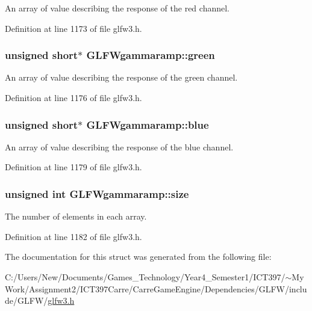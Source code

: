 An array of value describing the response of the red channel. 

Definition at line 1173 of file glfw3.h.\hypertarget{struct_g_l_f_wgammaramp_ffccc6f5df47820b6562d709da3a5a3a}{
\subsubsection[green]{\setlength{\rightskip}{0pt plus 5cm}unsigned short$\ast$ {\bf GLFWgammaramp::green}}}
\label{struct_g_l_f_wgammaramp_ffccc6f5df47820b6562d709da3a5a3a}


An array of value describing the response of the green channel. 

Definition at line 1176 of file glfw3.h.\hypertarget{struct_g_l_f_wgammaramp_cf0c836d0efe29c392fe8d1a1042744b}{
\subsubsection[blue]{\setlength{\rightskip}{0pt plus 5cm}unsigned short$\ast$ {\bf GLFWgammaramp::blue}}}
\label{struct_g_l_f_wgammaramp_cf0c836d0efe29c392fe8d1a1042744b}


An array of value describing the response of the blue channel. 

Definition at line 1179 of file glfw3.h.\hypertarget{struct_g_l_f_wgammaramp_d620e1cffbff9a32c51bca46301b59a5}{
\subsubsection[size]{\setlength{\rightskip}{0pt plus 5cm}unsigned int {\bf GLFWgammaramp::size}}}
\label{struct_g_l_f_wgammaramp_d620e1cffbff9a32c51bca46301b59a5}


The number of elements in each array. 

Definition at line 1182 of file glfw3.h.

The documentation for this struct was generated from the following file:\begin{CompactItemize}
\item 
C:/Users/New/Documents/Games\_\-Technology/Year4\_\-Semester1/ICT397/$\sim$My Work/Assignment2/ICT397Carre/CarreGameEngine/Dependencies/GLFW/include/GLFW/\hyperlink{glfw3_8h}{glfw3.h}\end{CompactItemize}
